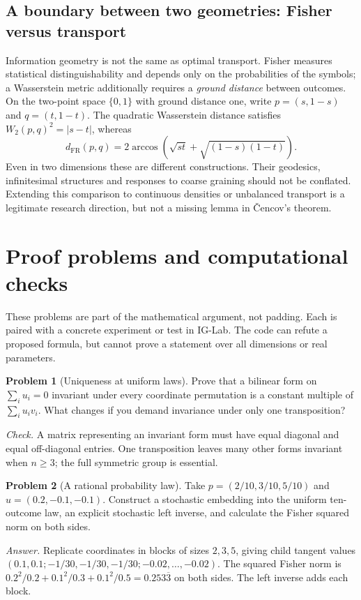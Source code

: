 \documentclass[11pt]{article}
\theoremstyle{definition}\newtheorem{definition}[theorem]{Definition}\newtheorem{exercise}{Problem}[section]
\begin{document}
\subsection{A boundary between two geometries: Fisher versus transport}

Information geometry is not the same as optimal transport. Fisher measures statistical distinguishability and depends only on the probabilities of the symbols; a Wasserstein metric additionally requires a \emph{ground distance} between outcomes. On the two-point space $\{0,1\}$ with ground distance one, write $p=(s,1-s)$ and $q=(t,1-t)$. The quadratic Wasserstein distance satisfies $W_2(p,q)^2=|s-t|$, whereas
\[
 d_{\mathrm{FR}}(p,q)=2\arccos\left(\sqrt{st}+\sqrt{(1-s)(1-t)}\right).
\]
Even in two dimensions these are different constructions. Their geodesics, infinitesimal structures and responses to coarse graining should not be conflated. Extending this comparison to continuous densities or unbalanced transport is a legitimate research direction, but not a missing lemma in \v{C}encov's theorem.

\section{Proof problems and computational checks}\label{sec:problems}

These problems are part of the mathematical argument, not padding. Each is paired with a concrete experiment or test in IG-Lab. The code can refute a proposed formula, but cannot prove a statement over all dimensions or real parameters.

\begin{exercise}[Uniqueness at uniform laws]
Prove that a bilinear form on $\sum_i u_i=0$ invariant under every coordinate permutation is a constant multiple of $\sum_i u_iv_i$. What changes if you demand invariance under only one transposition?
\end{exercise}
\emph{Check.} A matrix representing an invariant form must have equal diagonal and equal off-diagonal entries. One transposition leaves many other forms invariant when $n\ge3$; the full symmetric group is essential.

\begin{exercise}[A rational probability law]
Take $p=(2/10,3/10,5/10)$ and $u=(0.2,-0.1,-0.1)$. Construct a stochastic embedding into the uniform ten-outcome law, an explicit stochastic left inverse, and calculate the Fisher squared norm on both sides.
\end{exercise}
\emph{Answer.} Replicate coordinates in blocks of sizes $2,3,5$, giving child tangent values $(0.1,0.1;-1/30,-1/30,-1/30;-0.02,\ldots,-0.02)$. The squared Fisher norm is $0.2^2/0.2+0.1^2/0.3+0.1^2/0.5=0.253\overline3$ on both sides. The left inverse adds each block.
\end{document}
